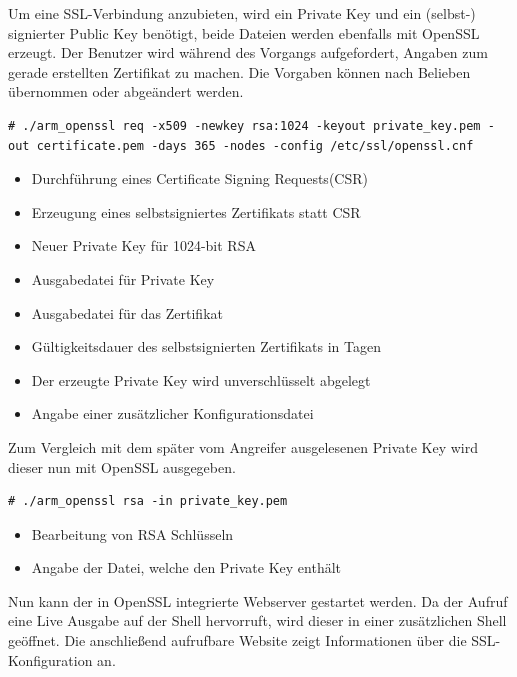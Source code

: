 Um eine SSL-Verbindung anzubieten, wird ein Private Key und ein (selbst-) signierter Public Key benötigt, beide Dateien werden ebenfalls mit OpenSSL erzeugt. Der Benutzer wird während des Vorgangs aufgefordert, Angaben zum gerade erstellten Zertifikat zu machen. Die Vorgaben können nach Belieben übernommen oder abgeändert werden.

\begin{lstlisting}
# ./arm_openssl req -x509 -newkey rsa:1024 -keyout private_key.pem -out certificate.pem -days 365 -nodes -config /etc/ssl/openssl.cnf
\end{lstlisting}

\begin{itemize}
	\item {} Durchführung eines Certificate Signing Requests(CSR)
	\item {} Erzeugung eines selbstsigniertes Zertifikats statt CSR
	\item {} Neuer Private Key für 1024-bit RSA
	\item {} Ausgabedatei für Private Key
	\item {} Ausgabedatei für das Zertifikat
	\item {} Gültigkeitsdauer des selbstsignierten Zertifikats in Tagen
	\item {} Der erzeugte Private Key wird unverschlüsselt abgelegt
	\item {} Angabe einer zusätzlicher Konfigurationsdatei
\end{itemize}

Zum Vergleich mit dem später vom Angreifer ausgelesenen Private Key wird dieser nun mit OpenSSL ausgegeben.

\begin{lstlisting}
# ./arm_openssl rsa -in private_key.pem
\end{lstlisting}

\begin{itemize}
	\item {} Bearbeitung von RSA Schlüsseln
	\item {} Angabe der Datei, welche den Private Key enthält
\end{itemize}

Nun kann der in OpenSSL integrierte Webserver gestartet werden. Da der Aufruf eine Live Ausgabe auf der Shell hervorruft, wird dieser in einer zusätzlichen Shell geöffnet. Die anschließend aufrufbare Website zeigt Informationen über die SSL-Konfiguration an.


